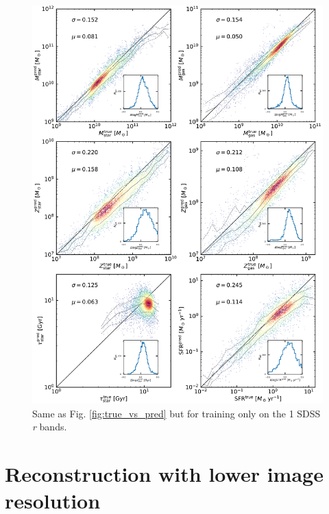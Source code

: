 \documentclass[useAMS,usenatbib]{mnras}
\begin{document}
\begin{figure}
\vspace{-.4cm}
\begin{center}
\includegraphics[height=.5\textheight]{./plots/predicted_vs_true_all_masked_log_r.pdf}
\end{center}
\vspace{-.5cm}
\caption{Same as Fig. \ref{fig:true_vs_pred} but for training only on the 1 SDSS \textit{r} bands.}
\label{fig:true_vs_pred4}
\end{figure}

\section{Reconstruction with lower image resolution}
\label{sec:ap_res}
\end{document}
